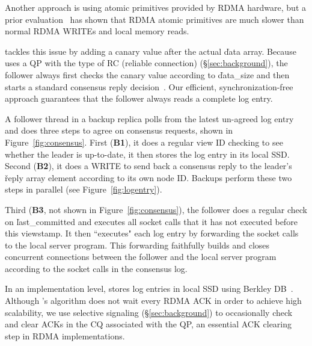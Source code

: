Another approach is using atomic primitives provided by RDMA hardware, 
but a prior evaluation~\cite{drtm:sosp15} has shown that RDMA atomic 
primitives are much slower than normal RDMA WRITEs and local memory reads.

\xxx tackles this issue by adding a canary value after the actual \v{data} 
array. Because \xxx uses a QP with the type of RC (reliable connection) 
(\S\ref{sec:background}), the follower always first checks the canary value 
according to \v{data\_size} and then starts a standard \paxos consensus reply 
decision~\cite{paxos:practical}. Our efficient, synchronization-free approach 
guarantees that the follower always reads a complete log entry.
% 

A follower thread in a backup replica polls from the latest un-agreed log 
entry and does three steps to agree on consensus requests, shown in 
Figure~\ref{fig:consensus}. First (\textbf{B1}), it does a regular \paxos view 
ID checking to see whether the leader is up-to-date, it then stores the log 
entry in its local SSD. Second (\textbf{B2}), it does a WRITE to send back 
a consensus reply to the leader's \v{reply} array element according to its 
own node ID. Backups perform these two steps in parallel 
(see Figure~\ref{fig:logentry}).

Third (\textbf{B3}, not shown in Figure~\ref{fig:consensus}), the follower 
does a regular \paxos check on \v{last\_committed} and executes all socket 
calls that it has not executed before this viewstamp. It then ``executes" each 
log entry by forwarding the socket calls to the local server program. This 
forwarding faithfully builds and closes concurrent connections between the 
follower and the local server program according to the socket calls in the 
consensus log.


In an implementation level, \xxx stores log entries in local SSD using Berkley 
DB~\cite{berkeleydb}. Although \xxx's algorithm does not wait every RDMA ACK in 
order to achieve high scalability, we use selective signaling 
(\S\ref{sec:background}) to occasionally check and clear ACKs in the CQ 
associated with the QP, an essential ACK clearing step in RDMA implementations.

